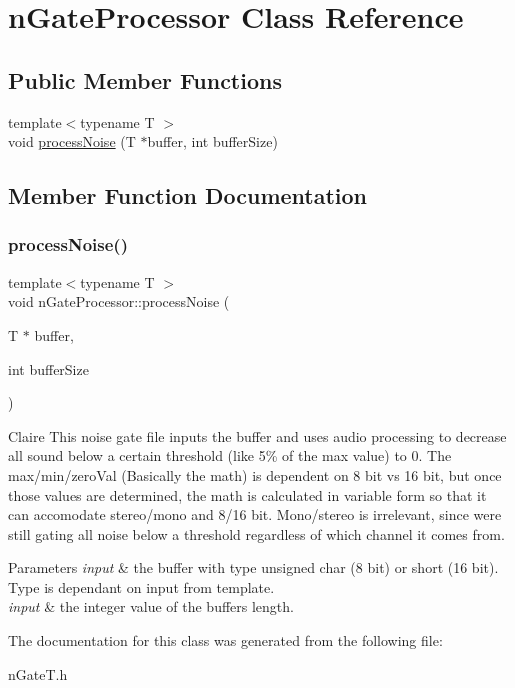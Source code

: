 \hypertarget{classnGateProcessor}{}\section{n\+Gate\+Processor Class Reference}
\label{classnGateProcessor}
\subsection*{Public Member Functions}
\begin{DoxyCompactItemize}
\item 
{\footnotesize template$<$typename T $>$ }\\void \hyperlink{classnGateProcessor_a3cbd26f67a293af6364a57ef5160517e}{process\+Noise} (T $\ast$buffer, int buffer\+Size)
\end{DoxyCompactItemize}


\subsection{Member Function Documentation}
\mbox{\label{classnGateProcessor_a3cbd26f67a293af6364a57ef5160517e}} 
\subsubsection{\texorpdfstring{process\+Noise()}{processNoise()}}
{\footnotesize\ttfamily template$<$typename T $>$ \\
void n\+Gate\+Processor\+::process\+Noise (\begin{DoxyParamCaption}\item[{T $\ast$}]{buffer,  }\item[{int}]{buffer\+Size }\end{DoxyParamCaption})\hspace{0.3cm}{\ttfamily [inline]}}

Claire This noise gate file inputs the buffer and uses audio processing to decrease all sound below a certain threshold (like 5\% of the max value) to 0. The max/min/zero\+Val (Basically the math) is dependent on 8 bit vs 16 bit, but once those values are determined, the math is calculated in variable form so that it can accomodate stereo/mono and 8/16 bit. Mono/stereo is irrelevant, since we\textquotesingle{}re still gating all noise below a threshold regardless of which channel it comes from. 
\begin{DoxyParams}{Parameters}
{\em input} & the buffer with type unsigned char (8 bit) or short (16 bit). Type is dependant on input from template. \\
\hline
{\em input} & the integer value of the buffer\textquotesingle{}s length. \\
\hline
\end{DoxyParams}


The documentation for this class was generated from the following file\+:\begin{DoxyCompactItemize}
\item 
n\+Gate\+T.\+h\end{DoxyCompactItemize}
